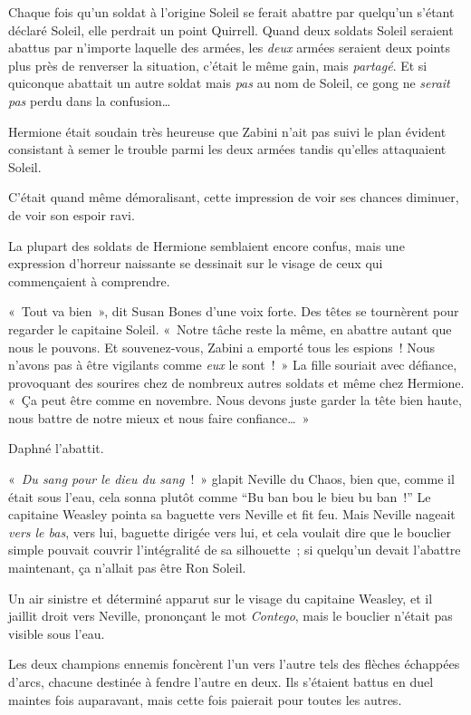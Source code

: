 Chaque fois qu'un soldat à l'origine Soleil se ferait abattre par quelqu'un s'étant déclaré Soleil, elle perdrait un point Quirrell. Quand deux soldats Soleil seraient abattus par n'importe laquelle des armées, les \emph{deux} armées seraient deux points plus près de renverser la situation, c'était le même gain, mais \emph{partagé}. Et si quiconque abattait un autre soldat mais \emph{pas} au nom de Soleil, ce gong ne \emph{serait pas} perdu dans la confusion…

Hermione était soudain très heureuse que Zabini n'ait pas suivi le plan évident consistant à semer le trouble parmi les deux armées tandis qu'elles attaquaient Soleil.

C'était quand même démoralisant, cette impression de voir ses chances diminuer, de voir son espoir ravi.

La plupart des soldats de Hermione semblaient encore confus, mais une expression d'horreur naissante se dessinait sur le visage de ceux qui commençaient à comprendre.

«~Tout va bien~», dit Susan Bones d'une voix forte. Des têtes se tournèrent pour regarder le capitaine Soleil. «~Notre tâche reste la même, en abattre autant que nous le pouvons. Et souvenez-vous, Zabini a emporté tous les espions~! Nous n'avons pas à être vigilants comme \emph{eux} le sont~!~» La fille souriait avec défiance, provoquant des sourires chez de nombreux autres soldats et même chez Hermione. «~Ça peut être comme en novembre. Nous devons juste garder la tête bien haute, nous battre de notre mieux et nous faire confiance…~»

Daphné l'abattit.

\later

«~\emph{Du sang pour le dieu du sang}~!~» glapit Neville du Chaos, bien que, comme il était sous l'eau, cela sonna plutôt comme “Bu ban bou le bieu bu ban~!”
Le capitaine Weasley pointa sa baguette vers Neville et fit feu. Mais Neville nageait \emph{vers le bas}, vers lui, baguette dirigée vers lui, et cela voulait dire que le bouclier simple pouvait couvrir l'intégralité de sa silhouette~; si quelqu'un devait l'abattre maintenant, ça n'allait pas être Ron Soleil.

Un air sinistre et déterminé apparut sur le visage du capitaine Weasley, et il jaillit droit vers Neville, prononçant le mot \emph{Contego}, mais le bouclier n'était pas visible sous l'eau.

Les deux champions ennemis foncèrent l'un vers l'autre tels des flèches échappées d'arcs, chacune destinée à fendre l'autre en deux. Ils s'étaient battus en duel maintes fois auparavant, mais cette fois paierait pour toutes les autres.

